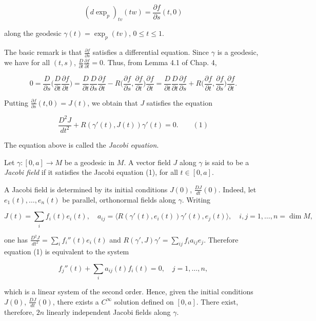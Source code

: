 $$
(d\exp_p)_{tv}(tw)=\frac{\partial f}{\partial s}(t,0)
$$

along the geodesic $\gamma(t)=\exp_p(tv)$, $0\le t\le 1$.

The basic remark is that $\frac{\partial f}{\partial s}$ satisfies a differential
equation. Since $\gamma$ is a geodesic, we have for all $(t,s)$,
$\frac{D}{\partial t}\frac{\partial f}{\partial t}=0$. Thus, from Lemma 4.1 of
Chap. 4,

$$
0=\frac{D}{\partial s}\Big(\frac{D}{\partial t}\frac{\partial f}{\partial t}\Big)
=\frac{D}{\partial t}\frac{D}{\partial s}\frac{\partial f}{\partial t}
-R\Big(\frac{\partial f}{\partial s},\frac{\partial f}{\partial t}\Big)\frac{\partial f}{\partial t}
=\frac{D}{\partial t}\frac{D}{\partial t}\frac{\partial f}{\partial s}
+R\Big(\frac{\partial f}{\partial t},\frac{\partial f}{\partial s}\Big)\frac{\partial f}{\partial t}.
$$

Putting $\frac{\partial f}{\partial s}(t,0)=J(t)$, we obtain that $J$ satisfies
the equation

$$
\frac{D^2 J}{dt^2}+R(\gamma'(t),J(t))\gamma'(t)=0.\qquad(1)
$$

The equation above is called the \emph{Jacobi equation}.

\begin{definition}
  \label{def:dc-ch5-2-1}
  Let $\gamma:[0,a]\to M$ be a geodesic in $M$. A vector field $J$ along $\gamma$ is
  said to be a \emph{Jacobi field} if it satisfies the Jacobi equation (1), for all
  $t\in[0,a]$.
  
  A Jacobi field is determined by its initial conditions $J(0)$,
  $\frac{DJ}{dt}(0)$. Indeed, let $e_1(t),\dots,e_n(t)$ be parallel, orthonormal
  fields along $\gamma$. Writing
  
  $$
  J(t)=\sum_i f_i(t)e_i(t),\quad a_{ij}=\langle R(\gamma'(t),e_i(t))\gamma'(t),e_j(t)\rangle,\quad i,j=1,\dots,n=\dim M,
  $$
  
  one has $\frac{D^2 J}{dt^2}=\sum_i f_i''(t)e_i(t)$ and
  $R(\gamma',J)\gamma'=\sum_{ij}f_i a_{ij}e_j$. Therefore equation (1) is equivalent
  to the system
  
  $$
  f_j''(t)+\sum_i a_{ij}(t)f_i(t)=0,\quad j=1,\dots,n,
  $$
  
  which is a linear system of the second order. Hence, given the initial
  conditions $J(0)$, $\frac{DJ}{dt}(0)$, there exists a $C^\infty$ solution defined
  on $[0,a]$. There exist, therefore, $2n$ linearly independent Jacobi fields along
  $\gamma$.
\end{definition}

